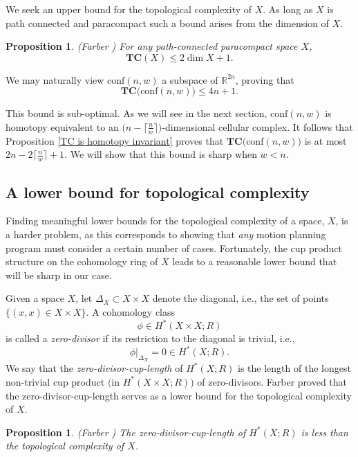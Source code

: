 \documentclass[pagebackref,colorlinks,citecolor=blue,linkcolor=blue,urlcolor=blue,filecolor=blue]{article}
\newtheorem{prop}[thm]{Proposition}
\theoremstyle{definition}\newtheorem{definition}[thm]{Definition}
\theoremstyle{definition}
\newcommand{\R}{\ensuremath{\mathbb{R}}}
\begin{document}
We seek an upper bound for the topological complexity of $X$.
As long as $X$ is path connected and paracompact such a bound arises from the dimension of $X$.

\begin{prop}\label{upper bound}
(Farber \cite[Theorem 4]{farber2003topological})
For any path-connected paracompact space $X$,
\[
\textbf{TC}(X)\le 2\dim X+1.
\]
\end{prop}

We may naturally view $\text{conf}(n,w)$ a subspace of $\R^{2n}$, proving that 
\[
\textbf{TC}\big(\text{conf}(n,w)\big)\le 4n+1.
\]

This bound is sub-optimal. 
As we will see in the next section, $\text{conf}(n,w)$ is homotopy equivalent to an $\big(n-\big\lceil\frac{n}{w}\big\rceil\big)$-dimensional cellular complex.
It follows that Proposition \ref{TC is homotopy invariant} proves that $\textbf{TC}\big(\text{conf}(n,w)\big)$ is at most $2n-2\big\lceil\frac{n}{w}\big\rceil+1$.
We will show that this bound is sharp when $w<n$.

\subsection{A lower bound for topological complexity}
Finding meaningful lower bounds for the topological complexity of a space, $X$, is a harder problem, as this corresponds to showing that \emph{any} motion planning program must consider a certain number of cases. 
Fortunately, the cup product structure on the cohomology ring of $X$ leads to a reasonable lower bound that will be sharp in our case.

Given a space $X$, let $\Delta_{X}\subset X\times X$ denote the diagonal, i.e., the set of points $\big\{(x, x)\in X\times X\big\}$.
A cohomology class 
\[
\phi\in H^{*}(X\times X;R)
\]
is called a \emph{zero-divisor} if its restriction to the diagonal is trivial, i.e.,
\[
\phi|_{\Delta_{X}}=0\in H^{*}(X;R).
\]
We say that the \emph{zero-divisor-cup-length} of $H^{*}(X;R)$ is the length of the longest non-trivial cup product $\big($in $H^{*}(X\times X;R)\big)$ of zero-divisors.
Farber proved that the zero-divisor-cup-length serves as a lower bound for the topological complexity of $X$.

\begin{prop}\label{cup product lower bound general}
(Farber \cite[Theorem 7]{farber2003topological})
The zero-divisor-cup-length of $H^{*}(X;R)$ is less than the topological complexity of $X$.
\end{prop}
\end{document}
